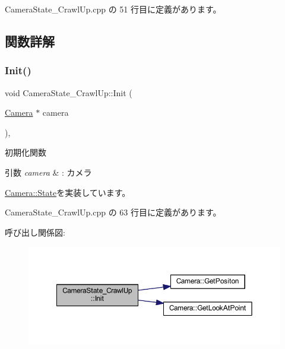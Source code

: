  Camera\+State\+\_\+\+Crawl\+Up.\+cpp の 51 行目に定義があります。



\subsection{関数詳解}
\mbox{\label{class_camera_state___crawl_up_a43a47eb4e7445c6801e8316c5a635709}} 
\subsubsection{\texorpdfstring{Init()}{Init()}}
{\footnotesize\ttfamily void Camera\+State\+\_\+\+Crawl\+Up\+::\+Init (\begin{DoxyParamCaption}\item[{\mbox{\hyperlink{class_camera}{Camera}} $\ast$}]{camera }\end{DoxyParamCaption})\hspace{0.3cm}{\ttfamily [override]}, {\ttfamily [virtual]}}



初期化関数 


\begin{DoxyParams}{引数}
{\em camera} & \+: カメラ \\
\hline
\end{DoxyParams}


\mbox{\hyperlink{class_camera_1_1_state_aa1b81471ab15e64b3117ffe7de9560ff}{Camera\+::\+State}}を実装しています。



 Camera\+State\+\_\+\+Crawl\+Up.\+cpp の 63 行目に定義があります。

呼び出し関係図\+:\nopagebreak
\begin{figure}[H]
\begin{center}
\leavevmode
\includegraphics[width=350pt]{class_camera_state___crawl_up_a43a47eb4e7445c6801e8316c5a635709_cgraph}
\end{center}
\end{figure}
\mbox{\label{class_camera_state___crawl_up_a046ec18a91e31b210ae000133fa6113a}} 
